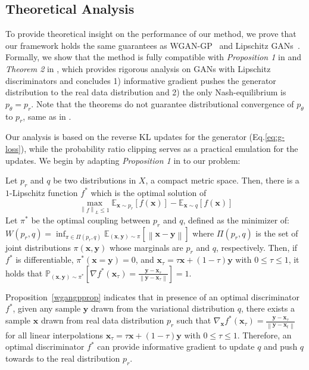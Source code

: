 \documentclass{article}
\newcommand{\0}{\bm{0}}
\newcommand{\xm}{\bm{x}}
\newcommand{\ym}{\bm{y}}
\newcommand{\EE}{\mathbb{E}}
\newcommand{\PP}{\mathbb{P}}
\newcommand{\norm}[1]{\left\|#1\right\|}
\newcommand{\x}{\bm{x}}
\newcommand{\y}{\bm{y}}
\newcommand{\PPz}{p}
\begin{document}
\subsection{Theoretical Analysis}\label{sec:theory}
To provide theoretical insight on the performance of our method, we prove that our framework holds the same guarantees as WGAN-GP~\citep{wgangp} and Lipschitz GANs~\citep{lipschitz}. Formally, we show that the method is fully compatible with \emph{Proposition 1} in \citep{wgangp} and \emph{Theorem 2} in \citep{lipschitz}, which provides rigorous analysis on GANs with Lipschitz discriminators and concludes 1) informative gradient pushes the generator distribution to the real data distribution and 2) the only Nash-equilibrium is $p_{\theta}=p_{r}$. Note that the theorems do not guarantee distributional convergence of $p_{\theta}$ to $p_r$, same as in \citep{wgangp,lipschitz}.







Our analysis is based on the reverse KL updates for the generator (Eq.\ref{eq:g-loss}), while the probability ratio clipping serves as a practical emulation for the updates. We begin by adapting \emph{Proposition 1} in \citet{wgangp} to our problem: 
\begin{prop} Let $\PPz_r$ and $q$ be two distributions in $X$, a compact metric space. Then, there is a $1$-Lipschitz function $f^*$ which is the optimal solution of $$\max_{\norm{f}_L \leq 1} \EE_{\xm \sim \PPz_r} \left[f(\xm)\right] - \EE_{\xm\sim q} \left[f(\xm)\right]$$
Let $\pi^*$ be the optimal coupling between $\PPz_r$ and $q$, defined as the minimizer of: $W(\PPz_r, q) = \inf_{\pi \in \Pi(\PPz_r,q)} \EE_{(\x,\y)\sim \pi} \left[\norm{\x - \y}\right]$ where $\Pi(\PPz_r, q)$ is the set of joint distributions $\pi(\x, \y)$ whose marginals are $\PPz_r$ and $q$, respectively. Then, if $f^*$ is differentiable, $\pi^*(\x = \y) = 0$, and $\x_\tau = \tau \x + (1-\tau)\y$ with $0 \leq \tau \leq 1$, it holds that 
$\PP_{(\x,\y)\sim\pi^*}\left[\nabla f^*(\x_\tau)=\frac{\y-\x_\tau}{\norm{\y-\x_\tau}}\right] = 1$. \label{wgangpprop}
\end{prop}
Proposition~\ref{wgangpprop} indicates that in presence of an optimal discriminator $f^*$, given any sample $\ym$ drawn from the variational distribution $q$, there exists a sample $\xm$ drawn from real data distribution $\PPz_r$ such that $\nabla_{\xm} f^*(\xm_\tau)\!=\!\frac{\ym-\xm_\tau}{\norm{\ym-\xm_t}}$ for all linear interpolations  $\xm_\tau  =  \tau \xm + (1-\tau)\ym$ with $0 \leq \tau \leq 1$. Therefore, an optimal discriminator $f^*$ can provide informative gradient to update $q$ and push $q$ towards to the real distribution $\PPz_r$. 
\end{document}
